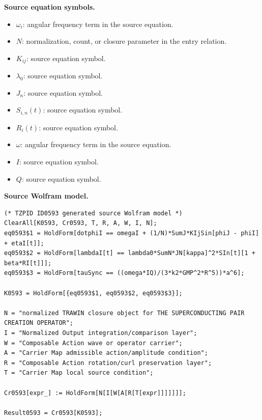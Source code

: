 \begin{minipage}[t]{0.49\linewidth}
\begingroup
\small
\raggedright
\textbf{Source equation symbols.}\par
\begin{itemize}[leftmargin=1.35em,itemsep=1pt,topsep=1pt,parsep=0pt]
    \item $\omega_i$: angular frequency term in the source equation.
    \item $N$: normalization, count, or closure parameter in the entry relation.
    \item $K_{ij}$: source equation symbol.
    \item $\lambda_0$: source equation symbol.
    \item $J_n$: source equation symbol.
    \item $S_{i,n}(t)$: source equation symbol.
    \item $R_i(t)$: source equation symbol.
    \item $\omega$: angular frequency term in the source equation.
    \item $I$: source equation symbol.
    \item $Q$: source equation symbol.
\end{itemize}
\endgroup
\end{minipage}\hfill
\begin{minipage}[t]{0.47\linewidth}
\begingroup
\scriptsize
\raggedright
\textbf{Source Wolfram model.}\par
\begin{Verbatim}[fontsize=\tiny,breaklines=true,breakanywhere=true]
(* TZPID ID0593 generated source Wolfram model *)
ClearAll[K0593, Cr0593, T, R, A, W, I, N];
eq0593$1 = HoldForm[dotphiI == omegaI + (1/N)*SumJ*KIjSin[phiJ - phiI] + etaI[t]];
eq0593$2 = HoldForm[lambdaI[t] == lambda0*SumN*JN[kappa]^2*SIn[t][1 + beta*RI[t]]];
eq0593$3 = HoldForm[tauSync == ((omega*IQ)/(3*k2*GMP^2*R^5))*a^6];

K0593 = HoldForm[{eq0593$1, eq0593$2, eq0593$3}];

N = "normalized TRAWIN closure object for THE SUPERCONDUCTING PAIR CREATION OPERATOR";
I = "Normalized Output integration/comparison layer";
W = "Composable Action wave or operator carrier";
A = "Carrier Map admissible action/amplitude condition";
R = "Composable Action rotation/curl preservation layer";
T = "Carrier Map local source condition";

Cr0593[expr_] := HoldForm[N[I[W[A[R[T[expr]]]]]]];

Result0593 = Cr0593[K0593];
\end{Verbatim}
\endgroup
\end{minipage}

